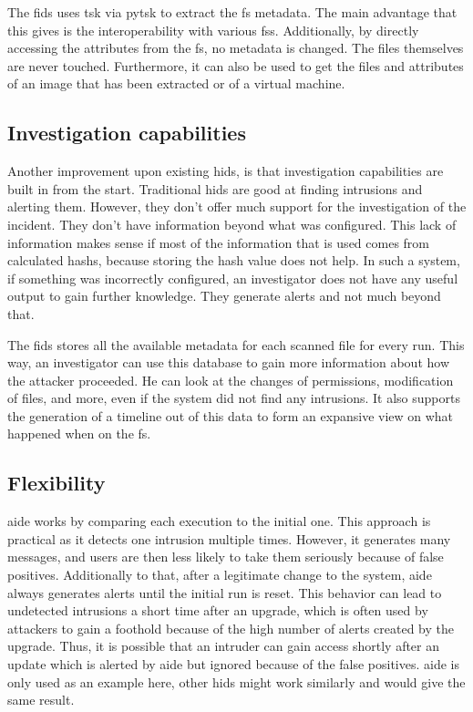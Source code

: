 The \gls{fids} uses \gls{tsk} via \gls{pytsk} to extract the \gls{fs} \gls{metadata}. The main advantage that this gives is the interoperability with various \glspl{fs}. Additionally, by directly accessing the attributes from the \gls{fs}, no \gls{metadata} is changed. The files themselves are never touched. Furthermore, it can also be used to get the files and attributes of an image that has been extracted or of a virtual machine. 

\subsection{Investigation capabilities}
\label{sec:investigation:capabilities}

Another improvement upon existing \gls{hids}, is that investigation capabilities are built in from the start. Traditional \gls{hids} are good at finding intrusions and alerting them. However, they don't offer much support for the investigation of the incident. They don't have information beyond what was configured. This lack of information makes sense if most of the information that is used comes from calculated \glspl{hash}, because storing the hash value does not help. In such a system, if something was incorrectly configured, an investigator does not have any useful output to gain further knowledge. They generate alerts and not much beyond that.

The \gls{fids} stores all the available \gls{metadata} for each scanned file for every run. This way, an investigator can use this database to gain more information about how the attacker proceeded. He can look at the changes of permissions, modification of files, and more, even if the system did not find any intrusions. It also supports the generation of a timeline out of this data to form an expansive view on what happened when on the \gls{fs}. 

\subsection{Flexibility}

\Gls{aide} works by comparing each execution to the initial one. This approach is practical as it detects one intrusion multiple times. However, it generates many messages, and users are then less likely to take them seriously because of false positives. Additionally to that, after a legitimate change to the system, \gls{aide} always generates alerts until the initial run is reset. This behavior can lead to undetected intrusions a short time after an upgrade, which is often used by attackers to gain a foothold because of the high number of alerts created by the upgrade. Thus, it is possible that an intruder can gain access shortly after an update which is alerted by \gls{aide} but ignored because of the false positives. \Gls{aide} is only used as an example here, other \gls{hids} might work similarly and would give the same result.

